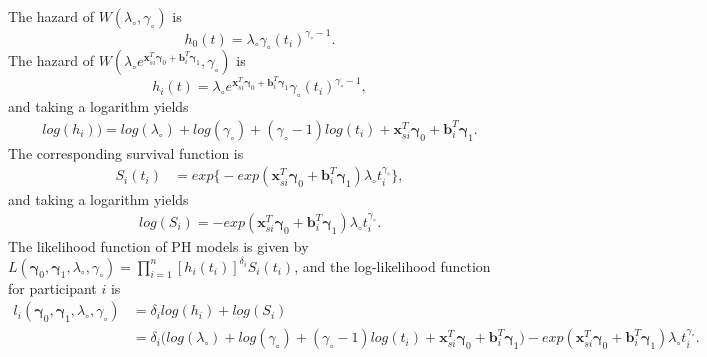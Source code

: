 The hazard of $W(\lambda_{\circ},\gamma_{\circ})$ is
\begin{equation}
    h_0(t) = \lambda_{\circ} \gamma_{\circ} (t_i)^{\gamma_{\circ}-1}.
\end{equation}
The hazard of $W(\lambda_{\circ}e^{\boldsymbol{x}_{si}^T \boldsymbol{\gamma}_0 + \boldsymbol{b}_i^T  \boldsymbol{\gamma}_1},\gamma_{\circ})$ is
\begin{equation}
    h_i(t) = \lambda_{\circ} e^{\boldsymbol{x}_{si}^T \boldsymbol{\gamma}_0 + \boldsymbol{b}_i^T  \boldsymbol{\gamma}_1} \gamma_{\circ} (t_i)^{\gamma_{\circ}-1},
\end{equation}
and taking a logarithm yields
\begin{equation}
    \begin{split}
        log(h_i)) = log(\lambda_{\circ}) + log(\gamma_{\circ}) + (\gamma_{\circ}-1)log(t_i) + \boldsymbol{x}_{si}^T \boldsymbol{\gamma}_0 + \boldsymbol{b}_i^T  \boldsymbol{\gamma}_1.
    \end{split}
\end{equation}
The corresponding survival function is 
\begin{equation}
    \begin{split}
        S_i(t_i) &= exp\big\{-exp(\boldsymbol{x}_{si}^T \boldsymbol{\gamma}_0 + \boldsymbol{b}_i^T  \boldsymbol{\gamma}_1) \lambda_{\circ}t_i^{\gamma_{\circ}} \big\},
    \end{split}
\end{equation}
and taking a logarithm yields
\begin{equation}
    \begin{split}
        log(S_i) = -exp(\boldsymbol{x}_{si}^T \boldsymbol{\gamma}_0 + \boldsymbol{b}_i^T  \boldsymbol{\gamma}_1) \lambda_{\circ}t_i^{\gamma_{\circ}}.
    \end{split}
\end{equation}
The likelihood function of PH models is given by $L(\boldsymbol{\gamma}_0, \boldsymbol{\gamma}_1, \lambda_{\circ}, \gamma_{\circ})=\prod_{i=1}^n [h_i(t_i)]^{\delta_i}S_i(t_i)$, and the log-likelihood function for participant $i$ is
\begin{equation}
    \begin{split}
        l_i(\boldsymbol{\gamma}_0, \boldsymbol{\gamma}_1, \lambda_{\circ}, \gamma_{\circ}) &= \delta_i log(h_i) + log(S_i)  \\
        &= \delta_i \big(log(\lambda_{\circ}) + log(\gamma_{\circ}) + (\gamma_{\circ}-1)log(t_i) + \boldsymbol{x}_{si}^T \boldsymbol{\gamma}_0 + \boldsymbol{b}_i^T  \boldsymbol{\gamma}_1 \big) -exp(\boldsymbol{x}_{si}^T \boldsymbol{\gamma}_0 + \boldsymbol{b}_i^T  \boldsymbol{\gamma}_1) \lambda_{\circ}t_i^{\gamma_{\circ}}.
    \end{split}
    \label{eq:logl1}
\end{equation}



